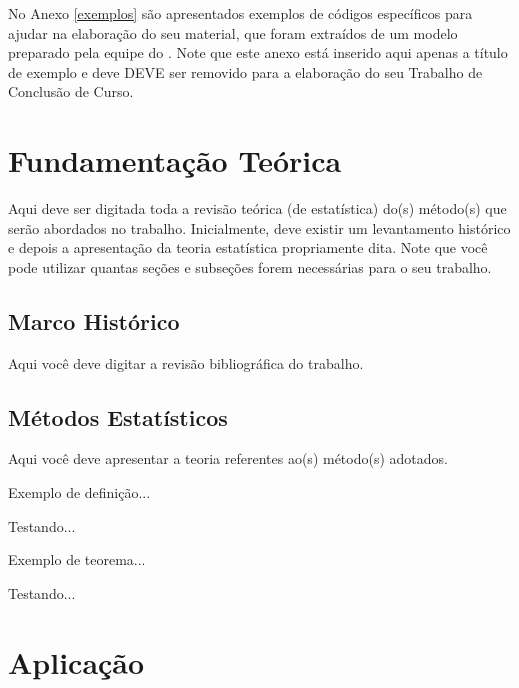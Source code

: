 \documentclass[12pt,oneside,a4paper,chapter=TITLE,english,brazil]{abntex2}
\begin{document}
No Anexo \ref{exemplos} são apresentados exemplos de códigos específicos para ajudar na elaboração do seu material, que foram extraídos de um modelo preparado pela equipe do \abnTeX. Note que este anexo está inserido aqui apenas a título de exemplo e deve DEVE ser removido para a elaboração do seu Trabalho de Conclusão de Curso.


\chapter{Fundamentação Teórica}

Aqui deve ser digitada toda a revisão teórica (de estatística) do(s) método(s) que serão abordados no trabalho. Inicialmente, deve existir um levantamento histórico e depois a apresentação da teoria estatística propriamente dita. Note que você pode utilizar quantas seções e subseções forem necessárias para o seu trabalho.


\section{Marco Histórico}

Aqui você deve digitar a revisão bibliográfica do trabalho.


\section{Métodos Estatísticos}

Aqui você deve apresentar a teoria referentes ao(s) método(s) adotados.

Exemplo de definição...
\begin{definicao}
	Testando...
\end{definicao}

Exemplo de teorema...
\begin{teorema}
	Testando...
\end{teorema}


\chapter{Aplicação}
\end{document}
